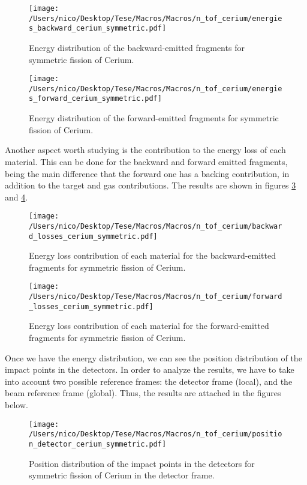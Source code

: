 \documentclass{article}
\begin{document}
\begin{figure}[H]
    \centering
    \texttt{[image: /Users/nico/Desktop/Tese/Macros/Macros/n\_tof\_cerium/energies\_backward\_cerium\_symmetric.pdf]}
    \caption{Energy distribution of the backward-emitted fragments for symmetric fission of Cerium.}
    \label{fig:energy_sym_back}
\end{figure}

\begin{figure}[H]
    \centering
    \texttt{[image: /Users/nico/Desktop/Tese/Macros/Macros/n\_tof\_cerium/energies\_forward\_cerium\_symmetric.pdf]}
    \caption{Energy distribution of the forward-emitted fragments for symmetric fission of Cerium.}
    \label{fig:energy_sym_forw}
\end{figure}

Another aspect worth studying is the contribution to the energy loss of each material. This can be done for the backward and forward emitted fragments, being the main difference that the forward one has a backing contribution, in addition to the target and gas contributions. The results are shown in figures \ref{fig:energy_loss_back_sym} and \ref{fig:energy_loss_forw_sym}. 
\begin{figure}[H]
    \centering
    \texttt{[image: /Users/nico/Desktop/Tese/Macros/Macros/n\_tof\_cerium/backward\_losses\_cerium\_symmetric.pdf]}
    \caption{Energy loss contribution of each material for the backward-emitted fragments for symmetric fission of Cerium.}
    \label{fig:energy_loss_back_sym}
\end{figure}
\begin{figure}[H]
    \centering
    \texttt{[image: /Users/nico/Desktop/Tese/Macros/Macros/n\_tof\_cerium/forward\_losses\_cerium\_symmetric.pdf]}
    \caption{Energy loss contribution of each material for the forward-emitted fragments for symmetric fission of Cerium.}
    \label{fig:energy_loss_forw_sym}
\end{figure}
Once we have the energy distribution, we can see the position distribution of the impact points in the detectors. In order to analyze the results, we have to take into account two possible reference frames: the detector frame (local), and the beam reference frame (global). Thus, the results are attached in the figures below. 

\begin{figure}[H]
    \centering
    \texttt{[image: /Users/nico/Desktop/Tese/Macros/Macros/n\_tof\_cerium/position\_detector\_cerium\_symmetric.pdf]}
    \caption{Position distribution of the impact points in the detectors for symmetric fission of Cerium in the detector frame.}
    \label{fig:pos_det_sym}
\end{figure}
\end{document}
